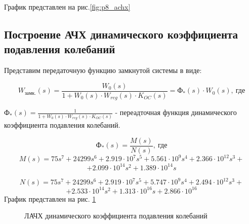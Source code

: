 \documentclass[main.tex]{subfiles}
\begin{document}
 График представлен на рис.\ref{fig:p8_achx} 

\subsection{Построение АЧХ динамического коэффициента подавления колебаний}
Представим передаточную функцию замкнутой системы в виде:

 \[  W_\text{замк.}(s) = \frac{W_0(s)}{1 + W_0(s)\cdot W_{reg}(s)\cdot K_{OC}(s)} = \text{Ф}_*(s) \cdot W_0(s),\ \text{где} \]

\( \text{Ф}_*(s) = \frac{1}{1 + W_0(s)\cdot W_{reg}(s)\cdot K_{OC}(s)} \) - переадточная функция динамического 
коэффициента подавления колебаний.


 \[ \text{Ф}_*(s) =  \frac{M(s)}{N(s)},\ \text{где}\]
\[ M(s) = 75s^7 + 24299s^6 + 2.919 \cdot 10^{7} s^5 + 5.561 \cdot 10^{9} s^4 + 2.366 \cdot 10^{12} s^3 + \]\[+2.099 \cdot 10^{14} s^2 + 1.389 \cdot 10^{14} s \]

\[ N(s) = 75s^7 + 24299s^6 + 2.919 \cdot 10^{7} s^5 + 5.747 \cdot 10^{9} s^4 + 2.494 \cdot 10^{12} s^3 +\]\[
+ 2.533 \cdot 10^{14} s^2 + 1.313 \cdot 10^{16} s + 2.866 \cdot 10^{16} \] 
График представлен на рис. \ref{fig:p9_dyn_k}
\begin{figure}[h]
    \caption{ЛАЧХ динамического коэффициента подавления колебаний}
    \label{fig:p9_dyn_k}
\end{figure}
\end{document}
